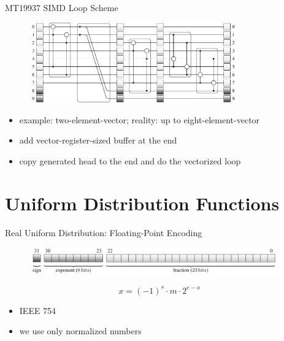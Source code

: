 \documentclass[aspectratio=169]{beamer}
\begin{document}
    \begin{frame}{MT19937 SIMD Loop Scheme}
      \begin{figure}
        \includegraphics[width=0.8\textwidth]{figures/mt19937_vector_loop_scheme.pdf}
      \end{figure}
      \begin{itemize}
        \pause
        \item example: two-element-vector; reality: up to eight-element-vector
        \pause
        \item add vector-register-sized buffer at the end
        \pause
        \item copy generated head to the end and do the vectorized loop
      \end{itemize}
    \end{frame}

    \section{Uniform Distribution Functions}
    \begin{frame}{Real Uniform Distribution: Floating-Point Encoding}
      \begin{figure}
        \includegraphics[width=0.95\textwidth]{figures/floating-point_encoding_single.pdf}
      \end{figure}
      \begin{mybox}
        \[
          x = (-1)^s \cdot m \cdot 2^{e - o}
        \]
      \end{mybox}
      \begin{itemize}
        \item IEEE 754
        \item we use only normalized numbers
      \end{itemize}
    \end{frame}
\end{document}
